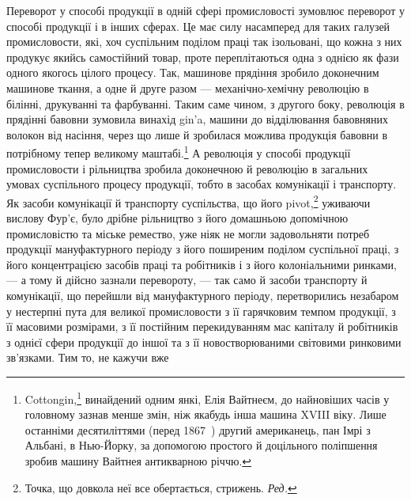 Переворот у способі продукції в одній сфері промисловості
зумовлює переворот у способі продукції і в інших сферах. Це
має силу насамперед для таких галузей промисловости, які,
хоч суспільним поділом праці так ізольовані, що кожна з них
продукує якийсь самостійний товар, проте переплітаються одна
з однією як фази одного якогось цілого процесу. Так, машинове
прядіння зробило доконечним машинове ткання, а одне й друге
разом — механічно-хемічну революцію в білінні, друкуванні
та фарбуванні. Таким саме чином, з другого боку, революція в
прядінні бавовни зумовила винахід gin’a, машини до відділювання
бавовняних волокон від насіння, через що лише й зробилася
можлива продукція бавовни в потрібному тепер великому маштабі.\footnote{
Cottongin,\footnote*{
Машина, що вибирає зерно з бавовни. \emph{Ред.}
} винайдений одним янкі, Елія Вайтнеєм, до найновіших
часів у головному зазнав менше змін, ніж якабудь інша машина XVIII віку.
Лише останніми десятиліттями (перед 1867~) другий американець, пан
Імрі з Альбані, в Нью-Йорку, за допомогою простого й доцільного
поліпшення зробив машину Вайтнея антикварною річчю.
}
А революція у способі продукції промисловости і рільництва
зробила доконечною й революцію в загальних умовах суспільного
процесу продукції, тобто в засобах комунікації і транспорту.
Як засоби комунікації й транспорту суспільства, що його
pivot,\footnote*{
Точка, що довкола неї все обертається, стрижень. \emph{Ред.}
} уживаючи вислову Фур’є, було дрібне рільництво з його
домашньою допомічною промисловістю та міське ремество, уже
ніяк не могли задовольняти потреб продукції мануфактурного
періоду з його поширеним поділом суспільної праці, з його концентрацією
засобів праці та робітників і з його колоніальними
ринками, — а тому й дійсно зазнали перевороту, — так само й
засоби транспорту й комунікації, що перейшли від мануфактурного
періоду, перетворились незабаром у нестерпні пута для
великої промисловости з її гарячковим темпом продукції, з її масовими
розмірами, з її постійним перекидуванням мас капіталу й
робітників з однієї сфери продукції до іншої та з її новостворюваними
світовими ринковими зв’язками. Тим то, не кажучи вже
\parbreak{}  %
